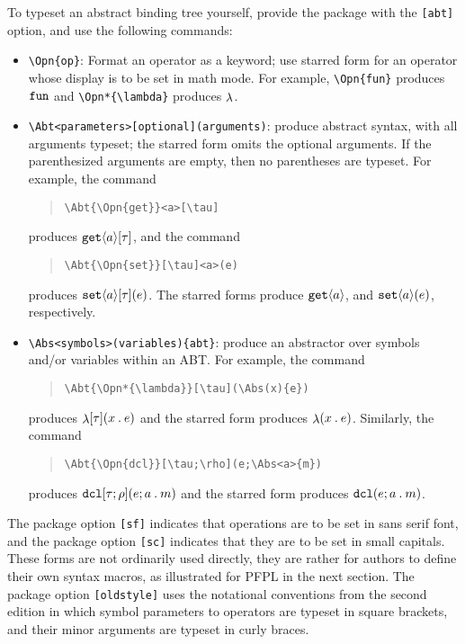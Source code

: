 \documentclass[11pt]{article}
\begin{document}
To typeset an abstract binding tree yourself, provide the package with the \verb|[abt]| option, and use the following commands:
\begin{itemize}
  \item \verb|\Opn{op}|: Format an operator as a keyword; use starred form for an operator whose display is to be set in math mode.  For example, \verb|\Opn{fun}| produces $\Opn{fun}$ and \verb|\Opn*{\lambda}| produces $\Opn*{\lambda}$.
  \item \verb|\Abt<parameters>[optional](arguments)|: produce abstract syntax, with all arguments typeset; the starred form omits the optional arguments.  If the parenthesized arguments are empty, then no parentheses are typeset.  For example, the command
  \begin{quote}
\begin{verbatim}
\Abt{\Opn{get}}<a>[\tau]
\end{verbatim}
  \end{quote}
  produces $\Abt{\Opn{get}}<a>[\tau]$, and the command
  \begin{quote}
\begin{verbatim}
\Abt{\Opn{set}}[\tau]<a>(e)
\end{verbatim}
  \end{quote}
  produces $\Abt{\Opn{set}}<a>[\tau](e)$.  The starred forms produce $\Abt*{\Opn{get}}<a>[\tau]$, and $\Abt*{\Opn{set}}<a>[\tau](e)$, respectively.

  \item \verb|\Abs<symbols>(variables){abt}|: produce an abstractor over symbols and/or variables within an ABT.  For example, the command
  \begin{quote}
\begin{verbatim}
\Abt{\Opn*{\lambda}}[\tau](\Abs(x){e})
\end{verbatim}
  \end{quote}
  produces $\Abt{\Opn*{\lambda}}[\tau](\Abs(x){e})$ and the starred form produces $\Abt*{\Opn*{\lambda}}[\tau](\Abs(x){e})$.  Similarly, the command
  \begin{quote}
\begin{verbatim}
\Abt{\Opn{dcl}}[\tau;\rho](e;\Abs<a>{m})
\end{verbatim}
  \end{quote}
  produces $\Abt{\Opn{dcl}}[\tau;\rho](e;\Abs<a>{m})$ and the starred form produces $\Abt*{\Opn{dcl}}[\tau\,\rho](e;\Abs<a>{m})$.
\end{itemize}
The package option \verb|[sf]| indicates that operations are to be set in sans serif font, and the package option \verb|[sc]| indicates that they are to be set in small capitals.  These forms are not ordinarily used directly, they are rather for authors to define their own syntax macros, as illustrated for \textsf{PFPL} in the next section.  The package option \verb|[oldstyle]| uses the notational conventions from the second edition in which symbol parameters to operators are typeset in square brackets, and their minor arguments are typeset in curly braces.
\end{document}
